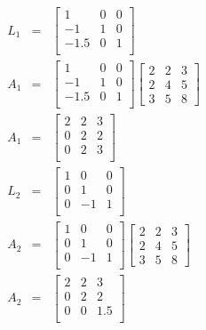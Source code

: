 \begin{eqnarray}
  L_1 &=& 
  \begin{bmatrix}
    1 & 0 & 0 \\
    -1 & 1 & 0 \\
    -1.5 & 0 & 1 \\
  \end{bmatrix}
  \\
  A_1 &=&
  \begin{bmatrix}
    1 & 0 & 0 \\
    -1 & 1 & 0 \\
    -1.5 & 0 & 1 \\
  \end{bmatrix}
  \begin{bmatrix}
    2 & 2 & 3 \\
    2 & 4 & 5 \\
    3 & 5 & 8    
  \end{bmatrix}
  \\
  A_1 &=&
  \begin{bmatrix}
    2 & 2 & 3 \\
    0 & 2 & 2 \\
    0 & 2 & 3 \\
  \end{bmatrix}
  \\
  L_2 &=& 
  \begin{bmatrix}
    1 & 0 & 0 \\
    0 & 1 & 0 \\
    0 & -1 & 1 \\
  \end{bmatrix}
  \\
  A_2 &=&
  \begin{bmatrix}
    1 & 0 & 0 \\
    0 & 1 & 0 \\
    0 & -1 & 1 \\
  \end{bmatrix}
  \begin{bmatrix}
    2 & 2 & 3 \\
    2 & 4 & 5 \\
    3 & 5 & 8    
  \end{bmatrix}
  \\
  A_2 &=&
  \begin{bmatrix}
    2 & 2 & 3 \\
    0 & 2 & 2 \\
    0 & 0 & 1.5 \\
  \end{bmatrix}
\end{eqnarray}

